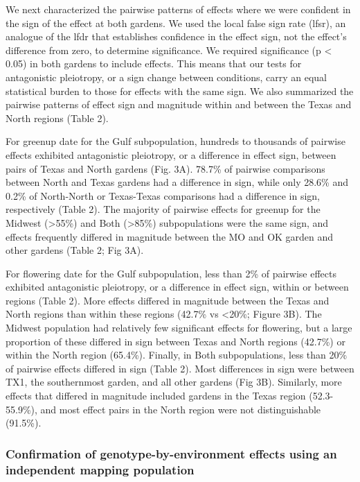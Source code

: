 \documentclass[
  9pt,
  twocolumn,
  twoside]{pnas-new}
\begin{document}
We next characterized the pairwise patterns of effects where we were
confident in the sign of the effect at both gardens. We used the local
false sign rate (lfsr), an analogue of the lfdr that establishes
confidence in the effect sign, not the effect's difference from zero, to
determine significance. We required significance (p \textless{} 0.05) in
both gardens to include effects. This means that our tests for
antagonistic pleiotropy, or a sign change between conditions, carry an
equal statistical burden to those for effects with the same sign. We
also summarized the pairwise patterns of effect sign and magnitude
within and between the Texas and North regions (Table 2).

For greenup date for the Gulf subpopulation, hundreds to thousands of
pairwise effects exhibited antagonistic pleiotropy, or a difference in
effect sign, between pairs of Texas and North gardens (Fig. 3A). 78.7\%
of pairwise comparisons between North and Texas gardens had a difference
in sign, while only 28.6\% and 0.2\% of North-North or Texas-Texas
comparisons had a difference in sign, respectively (Table 2). The
majority of pairwise effects for greenup for the Midwest
(\textgreater55\%) and Both (\textgreater85\%) subpopulations were the
same sign, and effects frequently differed in magnitude between the MO
and OK garden and other gardens (Table 2; Fig 3A).

For flowering date for the Gulf subpopulation, less than 2\% of pairwise
effects exhibited antagonistic pleiotropy, or a difference in effect
sign, within or between regions (Table 2). More effects differed in
magnitude between the Texas and North regions than within these regions
(42.7\% vs \textless20\%; Figure 3B). The Midwest population had
relatively few significant effects for flowering, but a large proportion
of these differed in sign between Texas and North regions (42.7\%) or
within the North region (65.4\%). Finally, in Both subpopulations, less
than 20\% of pairwise effects differed in sign (Table 2). Most
differences in sign were between TX1, the southernmost garden, and all
other gardens (Fig 3B). Similarly, more effects that differed in
magnitude included gardens in the Texas region (52.3-55.9\%), and most
effect pairs in the North region were not distinguishable (91.5\%).

\subsubsection{Confirmation of genotype-by-environment effects using an
independent mapping
population}\label{confirmation-of-genotype-by-environment-effects-using-an-independent-mapping-population}
\end{document}
